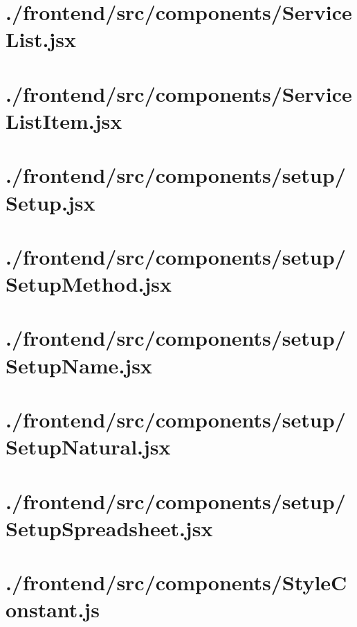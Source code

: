 \documentclass[11pt]{informatics-report}
\begin{document}
\newpage
\section{./frontend/src/components/ServiceList.jsx}


\newpage
\section{./frontend/src/components/ServiceListItem.jsx}


\newpage
\section{./frontend/src/components/setup/Setup.jsx}


\newpage
\section{./frontend/src/components/setup/SetupMethod.jsx}


\newpage
\section{./frontend/src/components/setup/SetupName.jsx}


\newpage
\section{./frontend/src/components/setup/SetupNatural.jsx}


\newpage
\section{./frontend/src/components/setup/SetupSpreadsheet.jsx}


\newpage
\section{./frontend/src/components/StyleConstant.js}

\end{document}
